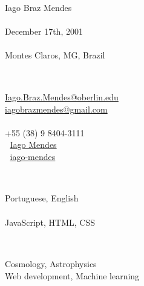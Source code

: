 \documentclass{cv}
\begin{document}
    \firstsection
        {
            \subsection*{}
                \faTag \\
                    Iago Braz Mendes \\
                \faCalendar \\
                    December 17th, 2001 \\
                \faHome \\
                    Montes Claros, MG, Brazil
        }
        {
            \subsection*{}
                \faEnvelopeO \\
                    {\footnotesize \href{mailto:Iago.Braz.Mendes@oberlin.edu}{Iago.Braz.Mendes@oberlin.edu}} \\
                    {\footnotesize \href{mailto:iagobrazmendes@gmail.com}{iagobrazmendes@gmail.com}} \\
                \faPhone \\
                    +55 (38) 9 8404-3111 \\
                \faLinkedin $\;$ \href{https://www.linkedin.com/in/iago-mendes-21a2361a2/}{Iago Mendes} \\
                \faGithub $\;$ \href{https://github.com/iago-mendes}{iago-mendes}
        }
        {
            \subsection*{}
                \faCommentsO \\
                    Portuguese, English \\
                \faCode \\
                    JavaScript, HTML, CSS
        }
        {
            \subsection*{}
                \faBook \\
                    Cosmology, Astrophysics
                \faDesktop \\
                    Web development, Machine learning
        }
\end{document}
